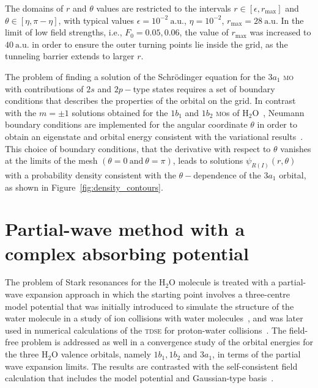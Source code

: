 The domains of $r$ and $\theta$ values are restricted to the intervals
$r\in[\epsilon, r_{\mathrm{max}}]$ and $\theta\in[\eta,\pi-\eta]$,
with typical values $\epsilon = 10^{-2}\ \mathrm{a.u.}$, $\eta =
10^{-2}$, $r_{\mathrm{max}} = 28\ \mathrm{a.u.}$ In the limit of low
field strengths, i.e., $F_{0} = 0.05, 0.06$, the value of
$r_{\mathrm{max}}$ was increased to $40\ \mathrm{a.u.}$ in order to
ensure the outer turning points lie inside the grid, as the tunneling
barrier extends to larger $r$.

The problem of finding a solution of the Schr\"{o}dinger equation for
the $3a_{1}$ \textsc{mo} with contributions of $2s$ and $2p-$type
states requires a set of boundary conditions that describes the
properties of the orbital on the grid. In contrast with the $m = \pm
1$ solutions obtained for the $1b_{1}$ and $1b_{2}$ \textsc{mo}s of
H$_{2}$O~\cite{sarias_2016}, Neumann boundary conditions are
implemented for the angular coordinate $\theta$ in order to obtain an
eigenstate and orbital energy consistent with the variational
results~\cite{Moccia_1964}. This choice of boundary conditions, that
the derivative with respect to $\theta$ vanishes at the limits of the
mesh $(\theta = 0 ~\mathrm{and}~ \theta = \pi)$, leads to solutions
$\psi_{R(I)}(r,\theta)$ with a probability density consistent with the
$\theta-$dependence of the $3a_{1}$ orbital, as shown in
Figure~\ref{fig:density_contours}.



\section{Partial-wave method with a complex absorbing potential}
\label{ch:partial_wave}




The problem of Stark resonances for the H$_{2}$O molecule is treated
with a partial-wave expansion approach in which the starting point
involves a three-centre model potential that was initially introduced
to simulate the structure of the water molecule in a study of ion
collisions with water molecules~\cite{illescas_modelV_2011}, and was
later used in numerical calculations of the \textsc{tdse} for
proton-water collisions~\cite{illescas_2015}. The field-free problem
is addressed as well in a convergence study of the orbital energies
for the three H$_{2}$O valence orbitals, namely $1b_{1}, 1b_{2}$ and
$3a_{1}$, in terms of the partial wave expansion limits. The results
are contrasted with the self-consistent field calculation that
includes the model potential and Gaussian-type
basis~\cite{illescas_2015}.

